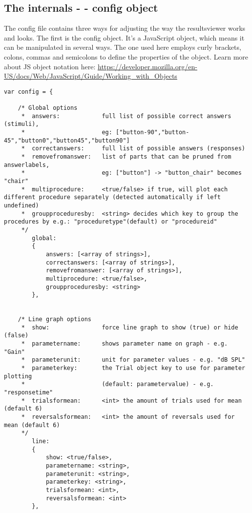 \subsection{The internals -  - config object}

The config file contains three ways for adjusting the way the resultsviewer works and looks. The first is the config object. 
It's a JavaScript object, which means it can be manipulated in several ways. The one used here employs curly brackets, colons, commas and semicolons to define the properties of the object.
Learn more about JS object notation here: \url{https://developer.mozilla.org/en-US/docs/Web/JavaScript/Guide/Working_with_Objects}

\begin{lstlisting}
var config = {
    
    /* Global options
     *  answers:            full list of possible correct answers (stimuli), 
     *                      eg: ["button-90","button-45","button0","button45","button90"]
     *  correctanswers:     full list of possible answers (responses)
     *  removefromanswer:   list of parts that can be pruned from answerlabels, 
     *                      eg: ["button"] -> "button_chair" becomes "chair"
     *  multiprocedure:     <true/false> if true, will plot each different procedure separately (detected automatically if left undefined)
     *  groupproceduresby:  <string> decides which key to group the procedures by e.g.: "proceduretype"(default) or "procedureid"
     */
        global: 
        {
            answers: [<array of strings>],
            correctanswers: [<array of strings>],
            removefromanswer: [<array of strings>],
            multiprocedure: <true/false>,
            groupproceduresby: <string>
        },
    
    
    /* Line graph options
     *  show:               force line graph to show (true) or hide (false)
     *  parametername:      shows parameter name on graph - e.g. "Gain"
     *  parameterunit:      unit for parameter values - e.g. "dB SPL"
     *  parameterkey:       the Trial object key to use for parameter plotting 
     *                      (default: parametervalue) - e.g. "responsetime"
     *  trialsformean:      <int> the amount of trials used for mean (default 6)
     *  reversalsformean:   <int> the amount of reversals used for mean (default 6)
     */
        line:
        {
            show: <true/false>,
            parametername: <string>,
            parameterunit: <string>,
            parameterkey: <string>,
            trialsformean: <int>,
            reversalsformean: <int>
        },
    

\end{lstlisting}
